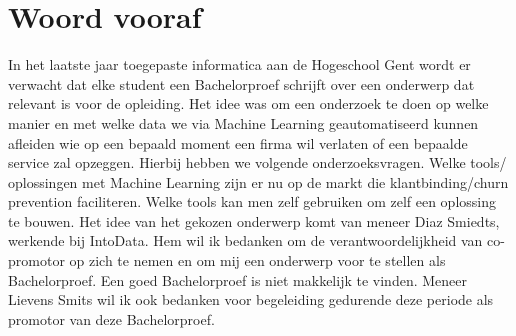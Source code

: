 
\chapter*{Woord vooraf}
\label{ch:voorwoord}

In het laatste jaar toegepaste informatica aan de Hogeschool Gent wordt er verwacht dat elke student een Bachelorproef schrijft over een onderwerp dat relevant is voor de opleiding. 
Het idee was om een onderzoek te doen op welke manier en met welke data we via Machine Learning geautomatiseerd kunnen afleiden wie op een bepaald moment een firma wil verlaten of een bepaalde service zal opzeggen. Hierbij hebben we volgende onderzoeksvragen. Welke tools/ oplossingen met Machine Learning zijn er nu op de markt die klantbinding/churn prevention faciliteren. Welke tools kan men zelf gebruiken om zelf een oplossing te bouwen.
Het idee van het gekozen onderwerp komt van meneer Diaz Smiedts, werkende bij IntoData. Hem wil ik bedanken om de verantwoordelijkheid van co-promotor op zich te nemen en om mij een onderwerp voor te stellen als Bachelorproef. Een goed Bachelorproef is niet makkelijk te vinden.
Meneer Lievens Smits wil ik ook bedanken voor begeleiding gedurende deze periode als promotor van deze Bachelorproef. 


